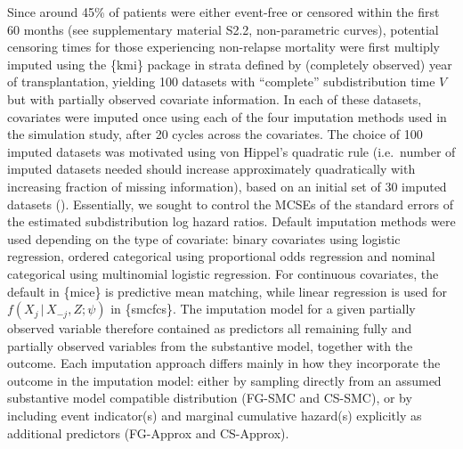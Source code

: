 \documentclass[
  letterpaper,
  DIV=11,
  numbers=noendperiod]{scrreprt}
\newcommand{\given}{\,|\,}
\begin{document}
Since around 45\% of patients were either event-free or censored within
the first 60 months (see supplementary material S2.2, non-parametric
curves), potential censoring times for those experiencing non-relapse
mortality were first multiply imputed using the \{kmi\} package in
strata defined by (completely observed) year of transplantation,
yielding 100 datasets with ``complete'' subdistribution time \(V\) but
with partially observed covariate information. In each of these
datasets, covariates were imputed once using each of the four imputation
methods used in the simulation study, after 20 cycles across the
covariates. The choice of 100 imputed datasets was motivated using von
Hippel's quadratic rule (i.e.~number of imputed datasets needed should
increase approximately quadratically with increasing fraction of missing
information), based on an initial set of 30 imputed datasets
().
Essentially, we sought to control the MCSEs of the standard errors of
the estimated subdistribution log hazard ratios. Default imputation
methods were used depending on the type of covariate: binary covariates
using logistic regression, ordered categorical using proportional odds
regression and nominal categorical using multinomial logistic
regression. For continuous covariates, the default in \{mice\} is
predictive mean matching, while linear regression is used for
\(f(X_j \given X_{-j}, Z;\psi)\) in \{smcfcs\}. The imputation model for
a given partially observed variable therefore contained as predictors
all remaining fully and partially observed variables from the
substantive model, together with the outcome. Each imputation approach
differs mainly in how they incorporate the outcome in the imputation
model: either by sampling directly from an assumed substantive model
compatible distribution (FG-SMC and CS-SMC), or by including event
indicator(s) and marginal cumulative hazard(s) explicitly as additional
predictors (FG-Approx and CS-Approx).
\end{document}
